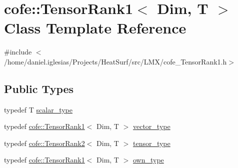 \hypertarget{classcofe_1_1TensorRank1}{\section{cofe\-:\-:Tensor\-Rank1$<$ Dim, T $>$ Class Template Reference}
\label{classcofe_1_1TensorRank1}
}


{\ttfamily \#include $<$/home/daniel.\-iglesias/\-Projects/\-Heat\-Surf/src/\-L\-M\-X/cofe\-\_\-\-Tensor\-Rank1.\-h$>$}

\subsection*{Public Types}
\begin{DoxyCompactItemize}
\item 
typedef T \hyperlink{classcofe_1_1TensorRank1_a10a89d234fbdb6695e1da39745f998c6}{scalar\-\_\-type}
\item 
typedef \hyperlink{classcofe_1_1TensorRank1}{cofe\-::\-Tensor\-Rank1}$<$ Dim, T $>$ \hyperlink{classcofe_1_1TensorRank1_a3224169c2fe2e9df2d6206df73748e68}{vector\-\_\-type}
\item 
typedef \hyperlink{classcofe_1_1TensorRank2}{cofe\-::\-Tensor\-Rank2}$<$ Dim, T $>$ \hyperlink{classcofe_1_1TensorRank1_a1cca644cefcf4dafe9196b7a3017811c}{tensor\-\_\-type}
\item 
typedef \hyperlink{classcofe_1_1TensorRank1}{cofe\-::\-Tensor\-Rank1}$<$ Dim, T $>$ \hyperlink{classcofe_1_1TensorRank1_aa4dd23616b69d69a174a7d52083f0d0c}{own\-\_\-type}
\end{DoxyCompactItemize}
